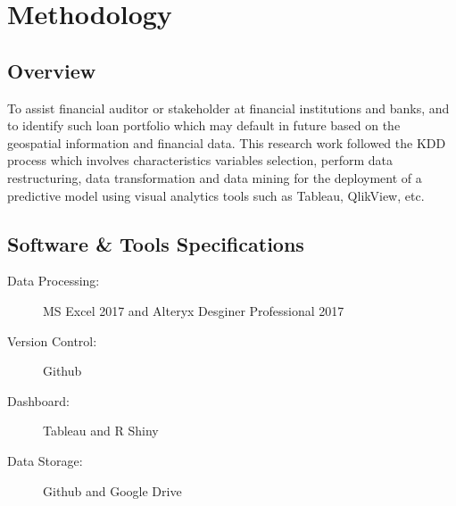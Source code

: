%
%
%
%

\chapter{Methodology}\label{C.Methodology}

\section{Overview}\label{S.Ch4.opening}
To assist financial auditor or stakeholder at financial institutions and banks, and to identify such loan portfolio which may default in future based on the geospatial information and financial data. This research work followed the KDD process which involves characteristics variables selection, perform data restructuring, data transformation and data mining for the deployment of a predictive model using visual analytics tools such as Tableau, QlikView, etc.


\section{Software \& Tools Specifications}\label{ch4.2}
\begin{description}
  \item[Data Processing:] MS Excel 2017 and Alteryx Desginer Professional 2017
  \item[Version Control:] Github
  \item[Dashboard:] Tableau and R Shiny
  \item[Data Storage:] Github and Google Drive
\end{description}

